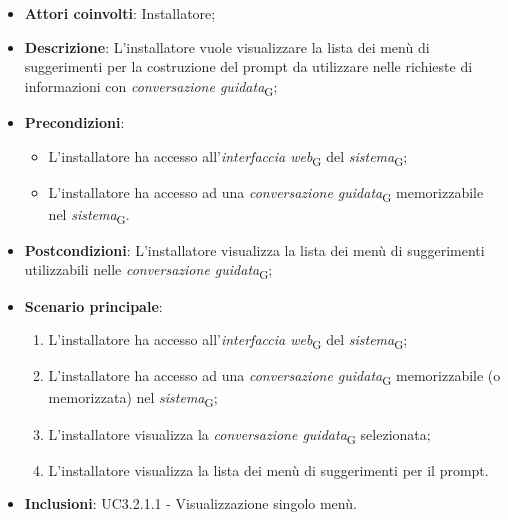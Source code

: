 \begin{itemize}
    \item \textbf{Attori coinvolti}: Installatore;
    \item \textbf{Descrizione}: L'installatore vuole visualizzare la lista dei menù di suggerimenti per la costruzione del prompt da utilizzare nelle richieste di informazioni con \textit{conversazione guidata}\textsubscript{G};
    \item \textbf{Precondizioni}: 
    \begin{itemize}
        \item L’installatore ha accesso all’\textit{interfaccia web}\textsubscript{G} del \textit{sistema}\textsubscript{G};
        \item L’installatore ha accesso ad una \textit{conversazione guidata}\textsubscript{G} memorizzabile nel \textit{sistema}\textsubscript{G}.
    \end{itemize}
    \item \textbf{Postcondizioni}: L'installatore visualizza la lista dei menù di suggerimenti utilizzabili nelle \textit{conversazione guidata}\textsubscript{G};
    \item \textbf{Scenario principale}:
    \begin{enumerate}
        \item L’installatore ha accesso all’\textit{interfaccia web}\textsubscript{G} del \textit{sistema}\textsubscript{G};
        \item L’installatore ha accesso ad una \textit{conversazione guidata}\textsubscript{G} memorizzabile (o memorizzata) nel \textit{sistema}\textsubscript{G};
        \item L'installatore visualizza la \textit{conversazione guidata}\textsubscript{G} selezionata;
        \item L'installatore visualizza la lista dei menù di suggerimenti per il prompt.
    \end{enumerate}
    \item \textbf{Inclusioni}: UC3.2.1.1 - Visualizzazione singolo menù.
\end{itemize}

